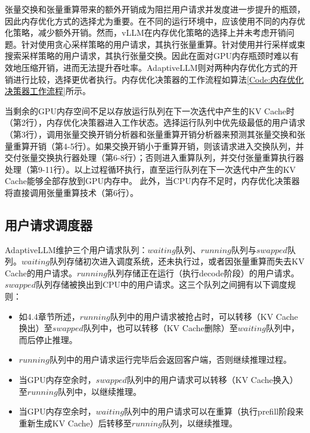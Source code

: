 张量交换和张量重算带来的额外开销成为阻拦用户请求并发度进一步提升的瓶颈，因此内存优化方式的选择尤为重要。在不同的运行环境中，应该使用不同的内存优化策略，减少额外开销。然而，vLLM在内存优化策略的选择上并未考虑开销问题。针对使用贪心采样策略的用户请求，其执行张量重算。针对使用并行采样或束搜索采样策略的用户请求，其执行张量交换。因此在面对GPU内存瓶颈时难以有效地压缩开销，进而无法提升吞吐率。AdaptiveLLM则对两种内存优化方式的开销进行比较，选择更优者执行。内存优化决策器的工作流程如算法\ref{Code:内存优化决策器工作流程}所示。

当剩余的GPU内存空间不足以存放运行队列在下一次迭代中产生的KV Cache时（第2行），内存优化决策器进入工作状态。选择运行队列中优先级最低的用户请求（第3行），调用张量交换开销分析器和张量重算开销分析器来预测其张量交换和张量重算开销（第4-5行）。如果交换开销小于重算开销，则该请求进入交换队列，并交付张量交换执行器处理（第6-8行）；否则进入重算队列，并交付张量重算执行器处理（第9-11行）。以上过程循环执行，直至运行队列在下一次迭代中产生的KV Cache能够全部存放到GPU内存中。 此外，当CPU内存不足时，内存优化决策器将直接调用张量重算技术（第6行）。

\subsection{用户请求调度器}

AdaptiveLLM维护三个用户请求队列：$waiting$队列、$running$队列与$swapped$队列。$waiting$队列存储初次进入调度系统，还未执行过，或者因张量重算而失去KV Cache的用户请求。$running$队列存储正在运行（执行decode阶段）的用户请求。$swapped$队列存储被换出到CPU中的用户请求。这三个队列之间拥有以下调度规则：

\begin{itemize} 

  \item 如4.4章节所述，$running$队列中的用户请求被抢占时，可以转移（KV Cache换出）至$swapped$队列中，也可以转移（KV Cache删除）至$waiting$队列中，而后停止推理。

  \item $running$队列中的用户请求运行完毕后会返回客户端，否则继续推理过程。

  \item 当GPU内存空余时，$swapped$队列中的用户请求可以转移（KV Cache换入）至$running$队列中，以继续推理。

  \item 当GPU内存空余时，$waiting$队列中的用户请求可以在重算（执行prefill阶段来重新生成KV Cache）后转移至$running$队列，以继续推理。

\end{itemize}

